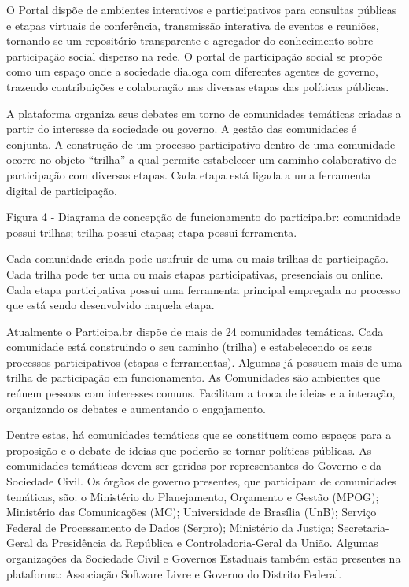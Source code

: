 \documentclass{article}
\begin{document}
O Portal dispõe de ambientes interativos e participativos para consultas
públicas e etapas virtuais de conferência, transmissão interativa de eventos e
reuniões, tornando-se um repositório transparente e agregador do conhecimento
sobre participação social disperso na rede. O portal de participação social se
propõe como um espaço onde a sociedade dialoga com diferentes agentes de
governo, trazendo contribuições e colaboração nas diversas etapas das políticas
públicas.

A plataforma organiza seus debates em torno de comunidades temáticas criadas a
partir do interesse da sociedade ou governo. A gestão das comunidades é
conjunta. A construção de um processo participativo dentro de uma comunidade
ocorre no objeto “trilha” a qual permite estabelecer um caminho colaborativo de
participação com diversas etapas. Cada etapa está ligada a uma ferramenta
digital de participação.  

Figura 4 - Diagrama de concepção de funcionamento do participa.br: comunidade
possui trilhas; trilha possui etapas; etapa possui ferramenta.

Cada comunidade criada pode usufruir de uma ou mais trilhas de participação.
Cada trilha pode ter uma ou mais etapas participativas, presenciais ou online.
Cada etapa participativa possui uma ferramenta principal empregada no processo
que está sendo desenvolvido naquela etapa.

Atualmente o Participa.br dispõe de mais de 24 comunidades temáticas. Cada
comunidade está construindo o seu caminho (trilha) e estabelecendo os seus
processos participativos (etapas e ferramentas). Algumas já possuem mais de uma
trilha de participação em funcionamento. As Comunidades são ambientes que
reúnem pessoas com interesses comuns. Facilitam a troca de ideias e a
interação, organizando os debates e aumentando o engajamento. 

Dentre estas, há comunidades temáticas que se constituem como espaços para a
proposição e o debate de ideias que poderão se tornar políticas públicas. As
comunidades temáticas devem ser geridas por representantes do Governo e da
Sociedade Civil. Os  órgãos de governo presentes, que participam de comunidades
temáticas, são: o  Ministério do Planejamento, Orçamento e Gestão (MPOG);
Ministério das Comunicações (MC); Universidade de Brasília (UnB); Serviço
Federal de Processamento de Dados (Serpro); Ministério da Justiça;
Secretaria-Geral da Presidência da República e Controladoria-Geral da União.
Algumas organizações da Sociedade Civil e Governos Estaduais também estão
presentes na plataforma: Associação Software Livre e Governo do Distrito
Federal.
\end{document}
